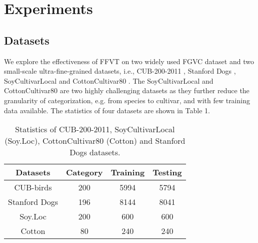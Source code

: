 \documentclass{bmvc2k}
\begin{document}
\section{Experiments}

\subsection{Datasets}
We explore the effectiveness of FFVT on two widely used FGVC dataset and two small-scale ultra-fine-grained datasets, i.e., CUB-200-2011 \cite{wah2011caltech}, Stanford Dogs \cite{khosla2011novel}, SoyCultivarLocal \cite{yu2020patchy} and CottonCultivar80 \cite{yu2020patchy}. The SoyCultivarLocal  and CottonCultivar80  are two highly challenging datasets as they further reduce the granularity of categorization, e.g. from species to cultivar, and with few training data available. The statistics of four datasets are shown in Table 1.

\begin{table}
\begin{center}
\begin{tabular}{|c|c|c|c|}
\hline
Datasets & Category & Training & Testing \\
\hline
CUB-birds & 200 & 5994 & 5794 \\
\hline
Stanford Dogs & 196 & 8144 & 8041 \\
\hline
Soy.Loc & 200 & 600 & 600 \\
\hline
Cotton & 80 & 240 & 240 \\
\hline
\end{tabular}
\end{center}
\caption{Statistics of CUB-200-2011, SoyCultivarLocal (Soy.Loc), CottonCultivar80 (Cotton) and Stanford Dogs datasets.}
\end{table}
\end{document}
